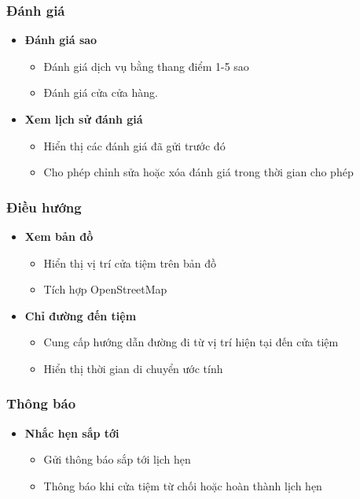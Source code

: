 \subsubsection{Đánh giá}
\begin{itemize}
    \item \textbf{Đánh giá sao}
    \begin{itemize}
        \item Đánh giá dịch vụ bằng thang điểm 1-5 sao
        \item Đánh giá cửa cửa hàng.
    \end{itemize}
    
    \item \textbf{Xem lịch sử đánh giá}
    \begin{itemize}
        \item Hiển thị các đánh giá đã gửi trước đó
        \item Cho phép chỉnh sửa hoặc xóa đánh giá trong thời gian cho phép
    \end{itemize}
\end{itemize}

\subsubsection{Điều hướng}
\begin{itemize}
    \item \textbf{Xem bản đồ}
    \begin{itemize}
        \item Hiển thị vị trí cửa tiệm trên bản đồ
        \item Tích hợp OpenStreetMap
    \end{itemize}
    
    \item \textbf{Chỉ đường đến tiệm}
    \begin{itemize}
        \item Cung cấp hướng dẫn đường đi từ vị trí hiện tại đến cửa tiệm
        \item Hiển thị thời gian di chuyển ước tính
    \end{itemize}
\end{itemize}

\subsubsection{ Thông báo}
\begin{itemize}
    \item \textbf{Nhắc hẹn sắp tới}
    \begin{itemize}
        \item Gửi thông báo sắp tới lịch hẹn
        \item Thông báo khi cửa tiệm từ chối hoặc hoàn thành lịch hẹn
    \end{itemize}
\end{itemize}

